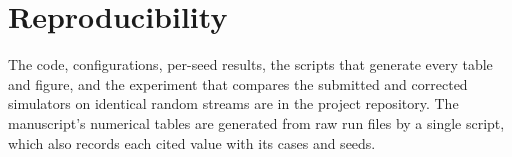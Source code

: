 \documentclass[10pt,a4paper]{article}
\begin{document}
\section*{Reproducibility}
The code, configurations, per-seed results, the scripts that generate every table and
figure, and the experiment that compares the submitted and corrected simulators on
identical random streams are in the project repository. The manuscript's numerical
tables are generated from raw run files by a single script, which also records each
cited value with its cases and seeds.
\end{document}
